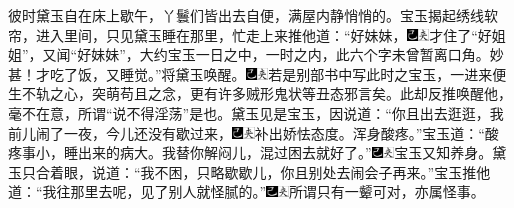 彼时黛玉自在床上歇午，丫鬟们皆出去自便，满屋内静悄悄的。宝玉揭起绣线软帘，进入里间，只见黛玉睡在那里，忙走上来推他道：``好妹妹，{\includegraphics[width=3mm]{../Images/00003}\includegraphics[width=3mm]{../Images/00012}\footnotesize \kaishu 才住了``好姐姐''，又闻``好妹妹''，大约宝玉一日之中，一时之内，此六个字未曾暂离口角。妙甚！}才吃了饭，又睡觉。''将黛玉唤醒。{\includegraphics[width=3mm]{../Images/00003}\includegraphics[width=3mm]{../Images/00012}\footnotesize \kaishu 若是别部书中写此时之宝玉，一进来便生不轨之心，突萌苟且之念，更有许多贼形鬼状等丑态邪言矣。此却反推唤醒他，毫不在意，所谓``说不得淫荡''是也。}黛玉见是宝玉，因说道：``你且出去逛逛，我前儿闹了一夜，今儿还没有歇过来，{\includegraphics[width=3mm]{../Images/00003}\includegraphics[width=3mm]{../Images/00012}\footnotesize \kaishu 补出娇怯态度。}浑身酸疼。''宝玉道：``酸疼事小，睡出来的病大。我替你解闷儿，混过困去就好了。''{\includegraphics[width=3mm]{../Images/00003}\includegraphics[width=3mm]{../Images/00012}\footnotesize \kaishu 宝玉又知养身。}黛玉只合着眼，说道：``我不困，只略歇歇儿，你且别处去闹会子再来。''宝玉推他道：``我往那里去呢，见了别人就怪腻的。''{\includegraphics[width=3mm]{../Images/00003}\includegraphics[width=3mm]{../Images/00012}\footnotesize \kaishu 所谓只有一颦可对，亦属怪事。}

